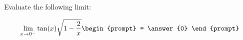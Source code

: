 \documentclass{ximera}
\author{Steven Gubkin}
\begin{document}
\begin{exercise}

Evaluate the following limit:

\[
\lim_{x \to 0^-} \tan(x) \sqrt{1 - \frac{2}{x}}   \begin{prompt} = \answer{0} \end{prompt}
\]

\end{exercise}
\end{document}
